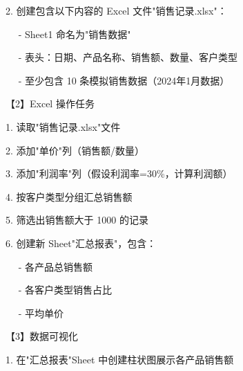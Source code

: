 \documentclass[
  american,
  chinese,
]{ctexart}
\begin{document}
\foreignlanguage{american}{2. }{创建包含以下内容的}\foreignlanguage{american}{ Excel }{文件}\foreignlanguage{american}{"}{销售记录}\foreignlanguage{american}{.xlsx"}{：}\foreignlanguage{american}{}

\foreignlanguage{american}{{~~ }- Sheet1 }{命名为}\foreignlanguage{american}{"}{销售数据}\foreignlanguage{american}{"}

\foreignlanguage{american}{{~~ }- }{表头：日期、产品名称、销售额、数量、客户类型}\foreignlanguage{american}{}

\foreignlanguage{american}{{~~ }- }{至少包含}\foreignlanguage{american}{ 10 }{条模拟销售数据（}\foreignlanguage{american}{2024}{年}\foreignlanguage{american}{1}{月数据）}\foreignlanguage{american}{}

{【}\foreignlanguage{american}{2}{】}\foreignlanguage{american}{Excel }{操作任务}\foreignlanguage{american}{}

\foreignlanguage{american}{1. }{读取}\foreignlanguage{american}{"}{销售记录}\foreignlanguage{american}{.xlsx"}{文件}\foreignlanguage{american}{}

\foreignlanguage{american}{2. }{添加}\foreignlanguage{american}{"}{单价}\foreignlanguage{american}{"}{列（销售额}\foreignlanguage{american}{/}{数量）}\foreignlanguage{american}{}

\foreignlanguage{american}{3. }{添加}\foreignlanguage{american}{"}{利润率}\foreignlanguage{american}{"}{列（假设利润率}\foreignlanguage{american}{=30\%}{，计算利润额）}\foreignlanguage{american}{}

\foreignlanguage{american}{4. }{按客户类型分组汇总销售额}\foreignlanguage{american}{}

\foreignlanguage{american}{5. }{筛选出销售额大于}\foreignlanguage{american}{ 1000 }{的记录}\foreignlanguage{american}{}

\foreignlanguage{american}{6. }{创建新}\foreignlanguage{american}{ Sheet"}{汇总报表}\foreignlanguage{american}{"}{，包含：}\foreignlanguage{american}{}

\foreignlanguage{american}{{~~ }- }{各产品总销售额}\foreignlanguage{american}{}

\foreignlanguage{american}{{~~ }- }{各客户类型销售占比}\foreignlanguage{american}{}

\foreignlanguage{american}{{~~ }- }{平均单价}\foreignlanguage{american}{}

{【}\foreignlanguage{american}{3}{】数据可视化}\foreignlanguage{american}{}

\foreignlanguage{american}{1. }{在}\foreignlanguage{american}{"}{汇总报表}\foreignlanguage{american}{"Sheet }{中创建柱状图展示各产品销售额}\foreignlanguage{american}{}
\end{document}
